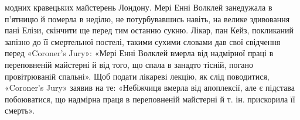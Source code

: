 модних кравецьких майстерень Лондону. Мері Енні Волклей
занедужала в п’ятницю й померла в неділю, не потурбувавшись
навіть, на велике здивовання пані Елізи, скінчити ще перед тим
останню сукню. Лікар, пан Кейз, покликаний запізно до її смертельної
постелі, такими сухими словами дав свої свідчення перед
«Coroner’s Jury»: «Мері Енні Волклей вмерла від надмірної праці
в переповненій майстерні й від того, що спала в занадто тісній,
погано провітрюваній спальні». Щоб подати лікареві лекцію,
як слід поводитися, «Coroner’s Jury» заявив на те: «Небіжчиця
вмерла від апоплексії, але є підстава побоюватися, що надмірна
праця в переповненій майстерні й т. ін. прискорила її смерть».